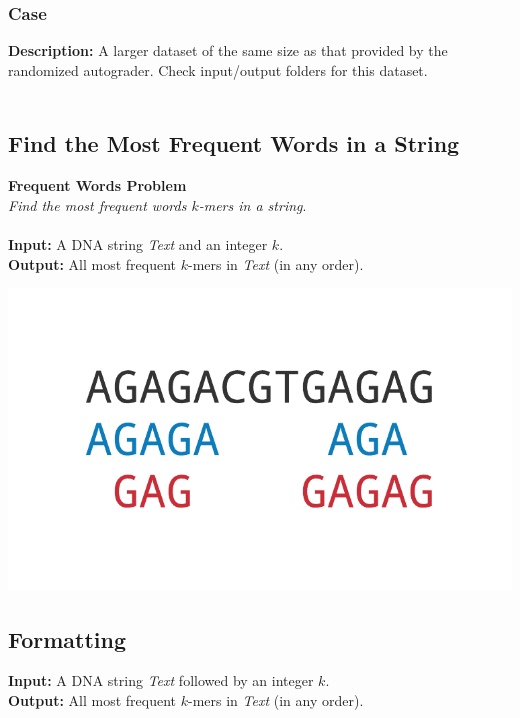 \documentclass{article}
\begin{document}
\subsubsection*{Case }
\hline \vspace{5}
\textbf{Description:} A larger dataset of the same size as that provided by the randomized autograder. Check input/output folders for this dataset.\\ \\
\pagebreak
\subsection{Find the Most Frequent Words in a String}
\hline\vspace{5}
\noindent \textbf{Frequent Words Problem}\\
\emph{Find the most frequent words $k$-mers in a string}.\\ \\
\textbf{Input:} A DNA string \emph{Text} and an integer $k$.\\
\textbf{Output:} All most frequent $k$-mers in \emph{Text} (in any order).
\begin{center}
    \includegraphics[scale=0.24]{c1/logos/1B.png} 
\end{center}
\hline\vspace{5}

\subsection*{Formatting}
\textbf{Input:} A DNA string \emph{Text} followed by an integer $k$.\\
\noindent \textbf{Output:} All most frequent $k$-mers in \emph{Text} (in any order).
\end{document}
